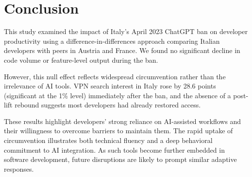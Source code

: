 \section{Conclusion}

This study examined the impact of Italy's April 2023 ChatGPT ban on developer productivity using a difference-in-differences approach comparing Italian developers with peers in Austria and France. We found no significant decline in code volume or feature-level output during the ban.

However, this null effect reflects widespread circumvention rather than the irrelevance of AI tools. VPN search interest in Italy rose by 28.6 points (significant at the 1\% level) immediately after the ban, and the absence of a post-lift rebound suggests most developers had already restored access.

These results highlight developers' strong reliance on AI-assisted workflows and their willingness to overcome barriers to maintain them. The rapid uptake of circumvention illustrates both technical fluency and a deep behavioral commitment to AI integration. As such tools become further embedded in software development, future disruptions are likely to prompt similar adaptive responses.
